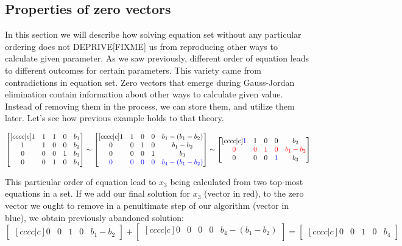 \subsection{Properties of zero vectors}
In this section we will describe how solving equation set without any particular ordering does not DEPRIVE[FIXME] us from reproducing other ways to calculate given parameter.
As we saw previously, different order of equation leads to different outcomes for certain parameters.
This variety came from contradictions in equation set.
Zero vectors that emerge during Gauss-Jordan elimination contain information about other ways to calculate given value.
Instead of removing them in the process, we can store them, and utilize them later.
Let's see how previous example holds to that theory.

\begin{equation}
\begin{bmatrix}[cccc|c]
    1 & 1 & 1 & 0 & b_1 \\ 
    1 & 1 & 0 & 0 & b_2 \\ 
    0 & 0 & 0 & 1 & b_3 \\ 
    0 & 0 & 1 & 0 & b_4
\end{bmatrix}
\sim
\begin{bmatrix}[cccc|c]
    1 & 1 & 0 & 0 & b_1 - (b_1 - b_2) \\ 
    0 & 0 & 1 & 0 & b_1 - b_2 \\ 
    0 & 0 & 0 & 1 & b_3 \\ 
    \textcolor{blue}{0} & \textcolor{blue}{0} & \textcolor{blue}{0} & \textcolor{blue}{0} &\textcolor{blue}{b_4 - (b_1 - b_2)}
\end{bmatrix}
\sim
\begin{bmatrix}[cccc|c]
    \textcolor{blue}{1} & 1 & 0 & 0 & b_2 \\ 
    \textcolor{red}{0} & \textcolor{red}{0} & \textcolor{red}{1} & \textcolor{red}{0} & \textcolor{red}{b_1 - b_2} \\ 
    0 & 0 & 0 & \textcolor{blue}{1} & b_3 \\ 
\end{bmatrix}
\end{equation}

This particular order of equation lead to $x_3$ being calculated from two top-most equations in a set.
If we add our final solution for $x_3$ (vector in red), to the zero vector we ought to remove in a penultimate step of our algorithm (vector in blue), we obtain previously abandoned solution:
\begin{equation}
\begin{bmatrix}[cccc|c]
    0 & 0 & 1 & 0 & b_1-b_2
\end{bmatrix}
+
\begin{bmatrix}[cccc|c]
    0 & 0 & 0 & 0 & b_4 - (b_1 - b_2) \\ 
\end{bmatrix}
=
\begin{bmatrix}[cccc|c]
    0 & 0 & 1 & 0 & b_4
\end{bmatrix}
\end{equation}

